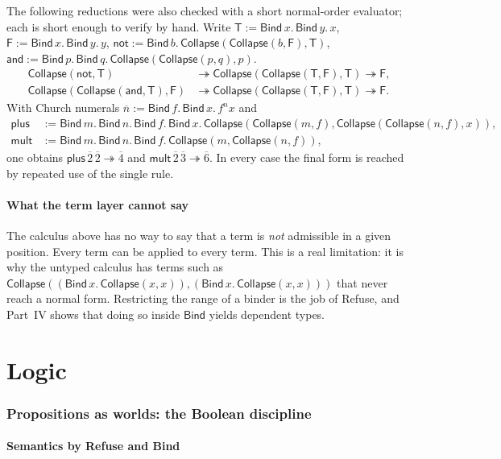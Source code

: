 \documentclass[11pt]{article}
\newcommand{\Bind}{\mathsf{Bind}}
\newcommand{\Coll}{\mathsf{Collapse}}
\newcommand{\bnd}[2]{\Bind\,#1.\,#2}
\newcommand{\col}[2]{\Coll(#1,#2)}
\theoremstyle{definition}
\theoremstyle{plain}
\theoremstyle{remark}
\begin{document}
The following reductions were also checked with a short normal-order evaluator; each is short enough to verify by hand. Write
$\mathsf{T}:=\bnd{x}{\bnd{y}{x}}$, $\mathsf{F}:=\bnd{x}{\bnd{y}{y}}$, $\mathsf{not}:=\bnd{b}{\col{\col{b}{\mathsf F}}{\mathsf T}}$, $\mathsf{and}:=\bnd{p}{\bnd{q}{\col{\col{p}{q}}{p}}}$.
\begin{align*}
\col{\mathsf{not}}{\mathsf T}&\twoheadrightarrow \col{\col{\mathsf T}{\mathsf F}}{\mathsf T}\twoheadrightarrow\mathsf F,\\
\col{\col{\mathsf{and}}{\mathsf T}}{\mathsf F}&\twoheadrightarrow \col{\col{\mathsf T}{\mathsf F}}{\mathsf T}\twoheadrightarrow\mathsf F.
\end{align*}
With Church numerals $\overline{n}:=\bnd{f}{\bnd{x}{f^n x}}$ and
\begin{align*}
\mathsf{plus}&:=\bnd{m}{\bnd{n}{\bnd{f}{\bnd{x}{\col{\col{m}{f}}{\col{\col{n}{f}}{x}}}}}},\\
\mathsf{mult}&:=\bnd{m}{\bnd{n}{\bnd{f}{\col{m}{\col{n}{f}}}}},
\end{align*}
one obtains $\mathsf{plus}\,\overline 2\,\overline 2\twoheadrightarrow\overline 4$ and $\mathsf{mult}\,\overline 2\,\overline 3\twoheadrightarrow\overline 6$. In every case the final form is reached by repeated use of the single rule.

\subsection{What the term layer cannot say}

The calculus above has no way to say that a term is \emph{not} admissible in a given position. Every term can be applied to every term. This is a real limitation: it is why the untyped calculus has terms such as $\col{(\bnd{x}{\col{x}{x}})}{(\bnd{x}{\col{x}{x}})}$ that never reach a normal form. Restricting the range of a binder is the job of Refuse, and Part~IV shows that doing so inside $\Bind$ yields dependent types.
\part{Logic}

\section{Propositions as worlds: the Boolean discipline}\label{sec:bool}

\subsection{Semantics by Refuse and Bind}
\end{document}

